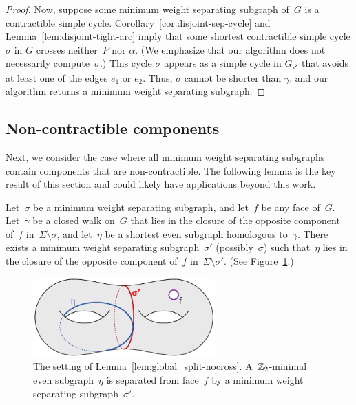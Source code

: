 \begin{proof}
Now, suppose some minimum weight separating subgraph of~$G$ is a contractible simple cycle. Corollary~\ref{cor:disjoint-sep-cycle} and Lemma~\ref{lem:disjoint-tight-arc} imply that some shortest contractible simple cycle $\sigma$ in $G$ crosses neither~$P$ nor $\alpha$.  (We emphasize that our algorithm does not necessarily compute~$\sigma$.)  This cycle $\sigma$ appears as a simple cycle in $\Gsnip$ that avoids at least one of the edges $e_1$ or $e_2$.  Thus, $\sigma$ cannot be shorter than $\gamma$, and our algorithm returns a minimum weight separating subgraph.
\end{proof}


\subsection{Non-contractible components}
\label{sec:global_non-contractible}
Next, we consider the case where all minimum weight separating subgraphs contain components that are non-contractible. The following lemma is the key result of this section and could likely have applications beyond this work.
\begin{lemma}
\label{lem:global_split-nocross}
Let~$\sigma$ be a minimum weight separating subgraph, and let~$f$ be any face of~$G$.
Let~$\gamma$ be a closed walk on~$G$ that lies in the closure of the opposite component of~$f$ in~$\Sigma \setminus \sigma$, and let~$\eta$
be a shortest even subgraph homologous to~$\gamma$.
There exists a minimum weight separating subgraph~$\sigma'$ (possibly~$\sigma$) such
that~$\eta$ lies in the closure of the opposite component of~$f$ in~$\Sigma \setminus \sigma'$. (See Figure~\ref{fig:global_nonsep-vs-shortsep}.)
\end{lemma}
\begin{figure}[h]
\centering
\includegraphics[height=1.2in]{Fig/nonsep-vs-shortsep}
\caption{The setting of Lemma~\ref{lem:global_split-nocross}. A~$\mathbb{Z}_2$-minimal even subgraph~$\eta$ is separated from face~$f$ by a minimum weight separating subgraph~$\sigma'$.}
\label{fig:global_nonsep-vs-shortsep}
\end{figure}
